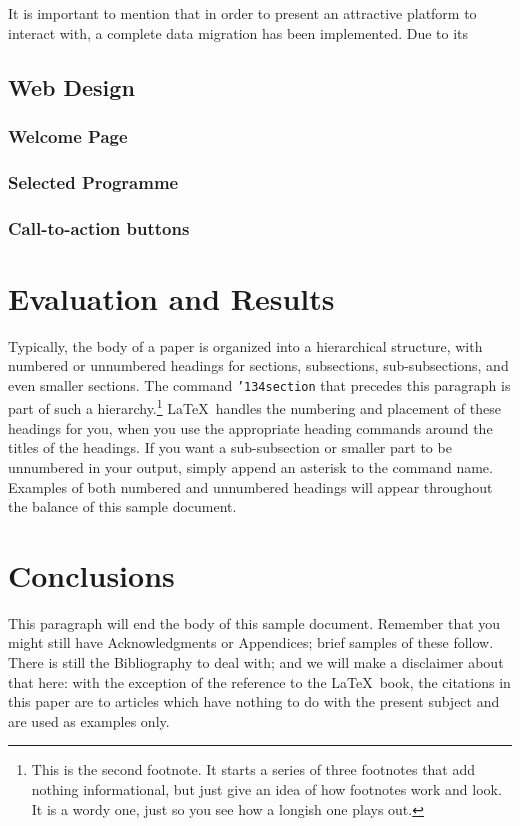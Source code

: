\documentclass{acm_proc_article-sp}
\begin{document}
It is important to mention that in order to present an attractive platform to interact with, a complete data migration has been implemented. Due to its 

\subsection{Web Design}

\subsubsection{Welcome Page}

\subsubsection{Selected Programme}

\subsubsection{Call-to-action buttons}

\section{Evaluation and Results}
Typically, the body of a paper is organized
into a hierarchical structure, with numbered or unnumbered
headings for sections, subsections, sub-subsections, and even
smaller sections.  The command \texttt{{\char'134}section} that
precedes this paragraph is part of such a
hierarchy.\footnote{This is the second footnote.  It
starts a series of three footnotes that add nothing
informational, but just give an idea of how footnotes work
and look. It is a wordy one, just so you see
how a longish one plays out.} \LaTeX\ handles the numbering
and placement of these headings for you, when you use
the appropriate heading commands around the titles
of the headings.  If you want a sub-subsection or
smaller part to be unnumbered in your output, simply append an
asterisk to the command name.  Examples of both
numbered and unnumbered headings will appear throughout the
balance of this sample document.

\section{Conclusions}
This paragraph will end the body of this sample document.
Remember that you might still have Acknowledgments or
Appendices; brief samples of these
follow.  There is still the Bibliography to deal with; and
we will make a disclaimer about that here: with the exception
of the reference to the \LaTeX\ book, the citations in
this paper are to articles which have nothing to
do with the present subject and are used as
examples only.
\end{document}
